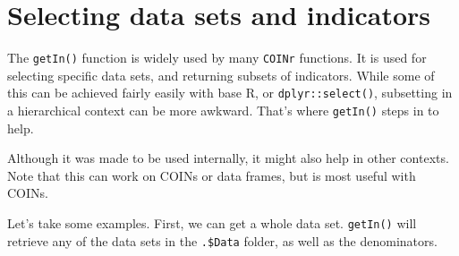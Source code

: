 \documentclass[
]{book}
\begin{document}
\hypertarget{selecting-data-sets-and-indicators}{%
\section{Selecting data sets and indicators}\label{selecting-data-sets-and-indicators}}

The \texttt{getIn()} function is widely used by many \texttt{COINr} functions. It is used for selecting specific data sets, and returning subsets of indicators. While some of this can be achieved fairly easily with base R, or \texttt{dplyr::select()}, subsetting in a hierarchical context can be more awkward. That's where \texttt{getIn()} steps in to help.

Although it was made to be used internally, it might also help in other contexts. Note that this can work on COINs or data frames, but is most useful with COINs.

Let's take some examples. First, we can get a whole data set. \texttt{getIn()} will retrieve any of the data sets in the \texttt{.\$Data} folder, as well as the denominators.
\end{document}
